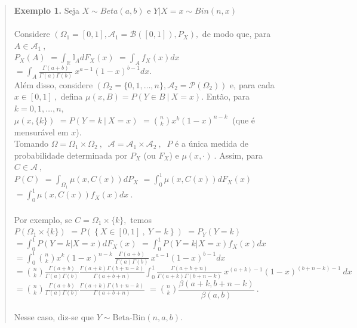\documentclass[
]{book}
\begin{document}
\begin{quote}
\textbf{Exemplo 1.} Seja \(X \sim Beta(a,b)\) e \(Y|X=x \sim Bin(n,x)\)\\
\(~\)\\
Considere \(\left(\Omega_1=[0,1],\mathcal{A}_1=\mathcal{B}([0,1]),P_X\right),\) de modo que, para \(A \in \mathcal{A}_1~,\)\\
\(P_X(A)\) \(=\displaystyle\int_{\mathbb{R}}\mathbb{I}_A dF_X(x)\) \(=\displaystyle\int_A f_X(x)dx\) \(=\displaystyle\int_A \tfrac{\Gamma(a+b)}{\Gamma(a)\Gamma(b)}~x^{a-1}(1-x)^{b-1}dx\).\\
Além disso, considere \(\left(\Omega_2=\{0,1,\ldots,n\}, \mathcal{A}_2=\mathcal{P}(\Omega_2)\right)\) e, para cada \(x \in [0,1]~,\) defina \(\mu(x,B)=P(Y \in B~|~ X=x).\) Então, para \(k=0,1,\ldots,n,\)\\
\(\mu\left(x,\{k\}\right)\) \(=P(Y=k~|~ X=x)\) \(=\displaystyle\binom{n}{k}x^k(1-x)^{n-k}~\) (que é mensurável em \(x\)).\\
Tomando \(\Omega=\Omega_1 \times \Omega_2~,~\) \(\mathcal{A}=\mathcal{A}_1 \times \mathcal{A}_2~,~\) \(P\) é a única medida de probabilidade determinada por \(P_X\) (ou \(F_X\)) e \(\mu(x,\cdot)~.\) Assim, para \(C \in \mathcal{A}~,\)\\
\(P(C)\) \(=\displaystyle\int_{\Omega_1}\mu\left(x,C(x)\right)dP_X\) \(=\displaystyle\int_0^1 \mu\left(x,C(x)\right)dF_X(x)\) \(=\displaystyle\int_0^1 \mu\left(x,C(x)\right)f_X(x)dx~.\)\\
\(~\)\\
Por exemplo, se \(C=\Omega_1 \times \{k\},\) temos\\
\(P\left(\Omega_1 \times \{k\}\right)\)
\(=P\left(\left\{X\in[0,1]~,~Y=k\right\}\right)\)
\(=P_Y\left(Y=k\right)\)
\(=\displaystyle\int_0^1P(Y=k|X=x)dF_X(x)\)
\(=\displaystyle\int_0^1P(Y=k|X=x)f_X(x)dx\)
\(=\displaystyle\int_0^1 \binom{n}{k}x^k(1-x)^{n-k} ~\tfrac{\Gamma(a+b)}{\Gamma(a)\Gamma(b)}~x^{a-1}(1-x)^{b-1}dx\)
\(=\displaystyle\binom{n}{k}\tfrac{\Gamma(a+b)}{\Gamma(a)\Gamma(b)}\tfrac{\Gamma(a+k)\Gamma(b+n-k)}{\Gamma(a+b+n)}\int_0^1\tfrac{\Gamma(a+b+n)}{\Gamma(a+k)\Gamma(b+n-k)}~x^{(a+k)-1}(1-x)^{(b+n-k)-1}~dx\)
\(=\displaystyle\binom{n}{k}\tfrac{\Gamma(a+b)}{\Gamma(a)\Gamma(b)}\tfrac{\Gamma(a+k)\Gamma(b+n-k)}{\Gamma(a+b+n)}\)
\(=\displaystyle\binom{n}{k}\dfrac{\beta(a+k,b+n-k)}{\beta(a,b)}~.\)\\
\(~\)\\
Nesse caso, diz-se que \(Y \sim \text{Beta-Bin}(n,a,b)\).
\end{quote}
\end{document}
